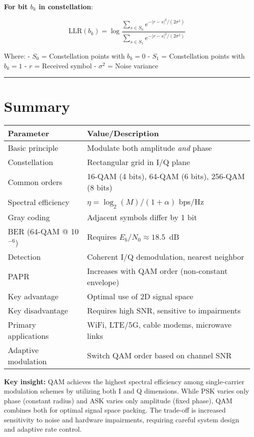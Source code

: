 \textbf{For bit \(b_k\) in constellation}:

\[
\text{LLR}(b_k) = \log\frac{\sum_{s \in S_0} e^{-|r-s|^2/(2\sigma^2)}}{\sum_{s \in S_1} e^{-|r-s|^2/(2\sigma^2)}}
\]

Where: - \(S_0\) = Constellation points with \(b_k = 0\) - \(S_1\) =
Constellation points with \(b_k = 1\) - \(r\) = Received symbol -
\(\sigma^2\) = Noise variance

\begin{center}\rule{0.5\linewidth}{0.5pt}\end{center}

\section{Summary}

\begin{center}
\begin{tabular}{@{}ll@{}}
\toprule
\textbf{Parameter} & \textbf{Value/Description} \\
\midrule
Basic principle & Modulate both amplitude \emph{and} phase \\
Constellation & Rectangular grid in I/Q plane \\
Common orders & 16-QAM (4 bits), 64-QAM (6 bits), 256-QAM (8 bits) \\
Spectral efficiency & $\eta = \log_2(M)/(1+\alpha)$ bps/Hz \\
Gray coding & Adjacent symbols differ by 1 bit \\
BER (64-QAM @ 10$^{-6}$) & Requires $E_b/N_0 \approx 18.5$~dB \\
Detection & Coherent I/Q demodulation, nearest neighbor \\
PAPR & Increases with QAM order (non-constant envelope) \\
Key advantage & Optimal use of 2D signal space \\
Key disadvantage & Requires high SNR, sensitive to impairments \\
Primary applications & WiFi, LTE/5G, cable modems, microwave links \\
Adaptive modulation & Switch QAM order based on channel SNR \\
\bottomrule
\end{tabular}
\end{center}

\textbf{Key insight:} QAM achieves the highest spectral efficiency among single-carrier modulation schemes by utilizing both I and Q dimensions. While PSK varies only phase (constant radius) and ASK varies only amplitude (fixed phase), QAM combines both for optimal signal space packing. The trade-off is increased sensitivity to noise and hardware impairments, requiring careful system design and adaptive rate control.

